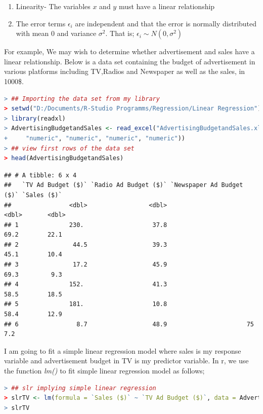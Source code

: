 \documentclass[
]{article}
\begin{document}
\begin{enumerate}
\def\labelenumi{\arabic{enumi}.}
\item
  Linearity- The variables \(x\) and \(y\) must have a linear
  relationship
\item
  The error terms \(\epsilon_i\) are independent and that the error is
  normally distributed with mean 0 and variance \(\sigma^2\). That is;
  \(\epsilon_i\sim N(0,\sigma^2)\)
\end{enumerate}

For example, We may wish to determine whether advertisement and sales
have a linear relationship. Below is a data set containing the budget of
advertisement in various platforms including TV,Radios and Newspaper as
well as the sales, in 1000\$.

\begin{lstlisting}[language=R]
> ## Importing the data set from my library
> setwd("D:/Documents/R-Studio Programms/Regression/Linear Regression")
> library(readxl)
> AdvertisingBudgetandSales <- read_excel("AdvertisingBudgetandSales.xlsx", col_types = c("skip",
+     "numeric", "numeric", "numeric", "numeric"))
> ## view first rows of the data set
> head(AdvertisingBudgetandSales)
\end{lstlisting}

\begin{lstlisting}
## # A tibble: 6 x 4
##   `TV Ad Budget ($)` `Radio Ad Budget ($)` `Newspaper Ad Budget ($)` `Sales ($)`
##                <dbl>                 <dbl>                     <dbl>       <dbl>
## 1              230.                   37.8                      69.2        22.1
## 2               44.5                  39.3                      45.1        10.4
## 3               17.2                  45.9                      69.3         9.3
## 4              152.                   41.3                      58.5        18.5
## 5              181.                   10.8                      58.4        12.9
## 6                8.7                  48.9                      75           7.2
\end{lstlisting}

I am going to fit a simple linear regression model where sales is my
response variable and advertisement budget in TV is my predictor
variable. In r, we use the function \emph{lm()} to fit simple linear
regression model as follows;

\begin{lstlisting}[language=R]
> ## slr implying simple linear regression
> slrTV <- lm(formula = `Sales ($)` ~ `TV Ad Budget ($)`, data = AdvertisingBudgetandSales)
> slrTV
\end{lstlisting}
\end{document}

